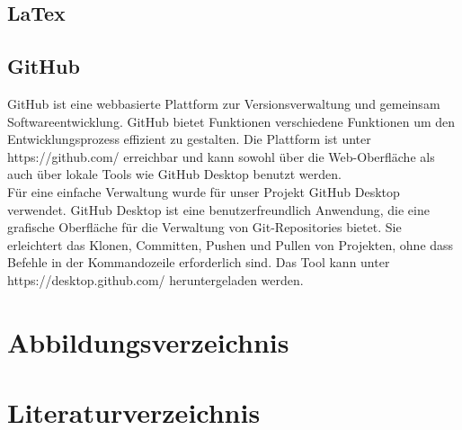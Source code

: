 \documentclass[ngerman,12pt,a4paper]{article}
\begin{document}
	 \subsection{LaTex}
	 
	 \subsection{GitHub}
	 GitHub ist eine webbasierte Plattform zur Versionsverwaltung und gemeinsam Softwareentwicklung. GitHub bietet Funktionen verschiedene Funktionen um den Entwicklungsprozess effizient zu gestalten. Die Plattform ist unter https://github.com/ erreichbar und kann sowohl über die Web-Oberfläche als auch über lokale Tools wie GitHub Desktop benutzt werden. \\[0.5cm]
	 Für eine einfache Verwaltung wurde für unser Projekt GitHub Desktop verwendet. GitHub Desktop ist eine benutzerfreundlich Anwendung, die eine grafische Oberfläche für die Verwaltung von Git-Repositories bietet. Sie erleichtert das Klonen, Committen, Pushen und Pullen von Projekten, ohne dass Befehle in der Kommandozeile erforderlich sind. Das Tool kann unter https://desktop.github.com/ heruntergeladen werden.
	 
\newpage
	
	\section{Abbildungsverzeichnis}
	
		\listoffigures
\newpage
	\section{Literaturverzeichnis}
		\listoffootnotes
 
	 
\end{document}
